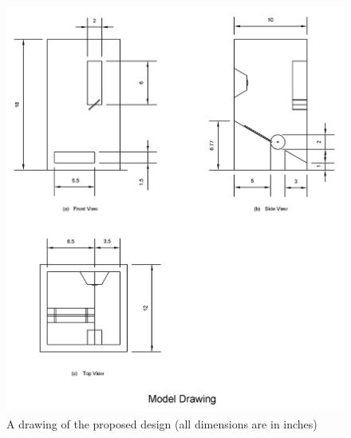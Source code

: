 \begin{figure}[H]
	\centering
	\includegraphics[width=1\linewidth]{./picture-files/model_drawing.png}
	\caption{A drawing of the proposed design (all dimensions are in inches)}
	\label{Model}
\end{figure}

